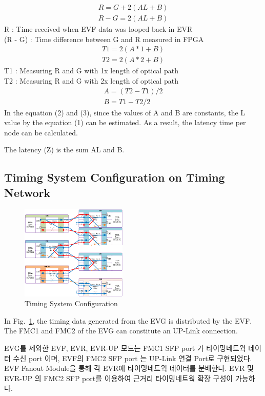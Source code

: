 \documentclass[journal,reqno]{IEEEtran}
\begin{document}
\begin {align} \label{eqn_r}
R = G + 2(AL + B) \nonumber \\
R - G = 2(AL + B) 
\end {align}
R : Time received when EVF data was looped back in EVR \\
(R - G) : Time difference between G and R measured in FPGA
\begin {align*}
T1 = 2(A*1 + B) \\
T2 = 2(A*2 + B)
\end {align*}
T1 : Measuring R and G with 1x length of optical path \\
T2 : Measuring R and G with 2x length of optical path
\begin {align}
A = (T2 - T1)/2 \\
B = T1 - T2/2
\end {align}
In the equation (2) and (3), since the values of A and B are constants, the L value by the equation (1) can be estimated.
As a result, the latency time per node can be calculated.

The latency (Z) is the sum AL and B.

\subsection{Timing System Configuration on Timing Network}

\begin{figure}[!htb]
	\centering
	\includegraphics*[width=0.45\textwidth, height=0.4\textwidth]{img14.png}
	\caption{Timing System Configuration}
	\label{timing_conf}
\end{figure}
In Fig.~\ref{timing_conf}, the timing data generated from the EVG is distributed by the EVF. The FMC1 and FMC2 of the EVG can constitute an UP-Link connection.

 EVG를 제외한 EVF, EVR, EVR-UP 모드는 FMC1 SFP port 가 타이밍네트웍 데이터 수신 port 이며, EVF의 FMC2 SFP port 는 UP-Link 연결 Port로 구현되었다. EVF Fanout Module을 통해 각 EVR에 타이밍네트웍 데이터를 분배한다. EVR 및 EVR-UP 의 FMC2 SFP port를 이용하여 근거리 타이밍네트웍 확장 구성이 가능하다.
\end{document}
